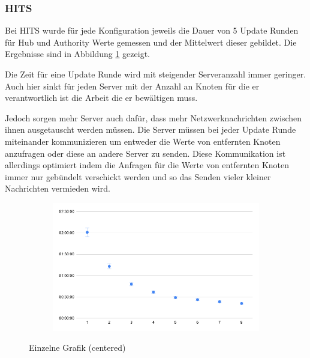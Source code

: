 \subsubsection{HITS}

Bei HITS wurde für jede Konfiguration jeweils die Dauer von 5 Update Runden für Hub und Authority Werte gemessen und der Mittelwert dieser gebildet. Die Ergebnisse sind in Abbildung \ref{eval:hits} gezeigt.

Die Zeit für eine Update Runde wird mit steigender Serveranzahl immer geringer. Auch hier sinkt für jeden Server mit der Anzahl an Knoten für die er verantwortlich ist die Arbeit die er bewältigen muss.

Jedoch sorgen mehr Server auch dafür, dass mehr Netzwerknachrichten zwischen ihnen ausgetauscht werden müssen.
Die Server müssen bei jeder Update Runde miteinander kommunizieren um entweder die Werte von entfernten Knoten anzufragen oder diese an andere Server zu senden. 
Diese Kommunikation ist allerdings optimiert indem die Anfragen für die Werte von entfernten Knoten immer nur gebündelt verschickt werden und so das Senden vieler kleiner Nachrichten vermieden wird.



\begin{figure}
  \centering
  \begin{subfigure}[b]{1.0\textwidth}
    \includegraphics[width=1.0\linewidth]{img/eval_hits.png}
  \end{subfigure}
  \caption{Einzelne Grafik (centered)}
  \label{eval:hits}
\end{figure}

